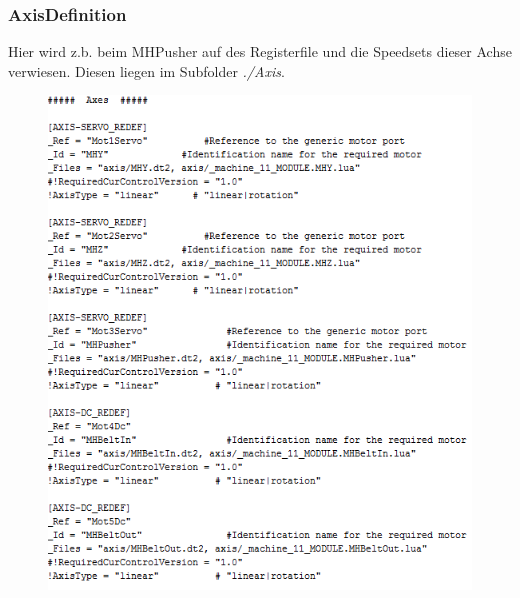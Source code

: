 		\subsubsection{AxisDefinition}
			Hier wird z.b. beim MHPusher auf des Registerfile und die Speedsets dieser Achse verwiesen. Diesen liegen im Subfolder \textit{./Axis}.
			\begin{figure}[!h]
				\centering
				\includegraphics[width=0.9\linewidth]{./pics/ccp/axisdefinition.png}
				\caption{}
				\label{}
			\end{figure}
